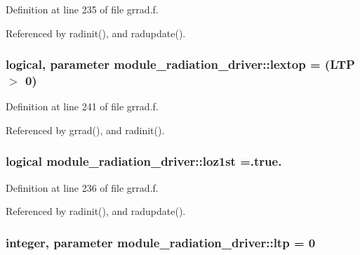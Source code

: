 Definition at line 235 of file grrad.\+f.



Referenced by radinit(), and radupdate().

\subsubsection[{\texorpdfstring{lextop}{lextop}}]{\setlength{\rightskip}{0pt plus 5cm}logical, parameter module\+\_\+radiation\+\_\+driver\+::lextop = (L\+TP $>$ 0)\hspace{0.3cm}{\ttfamily [private]}}\hypertarget{namespacemodule__radiation__driver_ad27b36d0186c8147fe839eb5c268d157}{}\label{namespacemodule__radiation__driver_ad27b36d0186c8147fe839eb5c268d157}


Definition at line 241 of file grrad.\+f.



Referenced by grrad(), and radinit().

\subsubsection[{\texorpdfstring{loz1st}{loz1st}}]{\setlength{\rightskip}{0pt plus 5cm}logical module\+\_\+radiation\+\_\+driver\+::loz1st =.true.\hspace{0.3cm}{\ttfamily [private]}}\hypertarget{namespacemodule__radiation__driver_af6e0e1ef2ebb78f57c897ebaf633edd2}{}\label{namespacemodule__radiation__driver_af6e0e1ef2ebb78f57c897ebaf633edd2}


Definition at line 236 of file grrad.\+f.



Referenced by radinit(), and radupdate().

\subsubsection[{\texorpdfstring{ltp}{ltp}}]{\setlength{\rightskip}{0pt plus 5cm}integer, parameter module\+\_\+radiation\+\_\+driver\+::ltp = 0\hspace{0.3cm}{\ttfamily [private]}}\hypertarget{namespacemodule__radiation__driver_aab2535e9906afd709124056f4ca1e470}{}\label{namespacemodule__radiation__driver_aab2535e9906afd709124056f4ca1e470}


